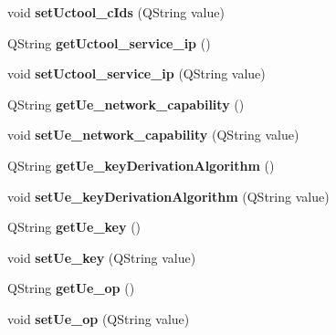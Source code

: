 \begin{DoxyCompactItemize}
\item 
void {\bfseries set\+Uctool\+\_\+c\+Ids} (Q\+String value)\hypertarget{class_ue_af285bcc0597ba10e0900b3abb677b772}{}\label{class_ue_af285bcc0597ba10e0900b3abb677b772}

\item 
Q\+String {\bfseries get\+Uctool\+\_\+service\+\_\+ip} ()\hypertarget{class_ue_a89424b4505fb125b0e30383eed88b0de}{}\label{class_ue_a89424b4505fb125b0e30383eed88b0de}

\item 
void {\bfseries set\+Uctool\+\_\+service\+\_\+ip} (Q\+String value)\hypertarget{class_ue_ac56432345c0765e5df0256e3419242c5}{}\label{class_ue_ac56432345c0765e5df0256e3419242c5}

\item 
Q\+String {\bfseries get\+Ue\+\_\+network\+\_\+capability} ()\hypertarget{class_ue_a8e3787efb14c2389f5bc174891e1dfde}{}\label{class_ue_a8e3787efb14c2389f5bc174891e1dfde}

\item 
void {\bfseries set\+Ue\+\_\+network\+\_\+capability} (Q\+String value)\hypertarget{class_ue_a93326268c1e8d4e31ab880e0545b69e4}{}\label{class_ue_a93326268c1e8d4e31ab880e0545b69e4}

\item 
Q\+String {\bfseries get\+Ue\+\_\+key\+Derivation\+Algorithm} ()\hypertarget{class_ue_ab24cb84e471460ad3e9341a6d2d28e65}{}\label{class_ue_ab24cb84e471460ad3e9341a6d2d28e65}

\item 
void {\bfseries set\+Ue\+\_\+key\+Derivation\+Algorithm} (Q\+String value)\hypertarget{class_ue_ab26b217b9be9825151c884c85daba3dd}{}\label{class_ue_ab26b217b9be9825151c884c85daba3dd}

\item 
Q\+String {\bfseries get\+Ue\+\_\+key} ()\hypertarget{class_ue_a5099b0f0987d8006bdfd2a9fe6ba4990}{}\label{class_ue_a5099b0f0987d8006bdfd2a9fe6ba4990}

\item 
void {\bfseries set\+Ue\+\_\+key} (Q\+String value)\hypertarget{class_ue_a88380930968f32dc900cdbd625fe9729}{}\label{class_ue_a88380930968f32dc900cdbd625fe9729}

\item 
Q\+String {\bfseries get\+Ue\+\_\+op} ()\hypertarget{class_ue_a595f96b5ca916c306147bb72e335277d}{}\label{class_ue_a595f96b5ca916c306147bb72e335277d}

\item 
void {\bfseries set\+Ue\+\_\+op} (Q\+String value)\hypertarget{class_ue_af595ec42490d9e6c03dc1fc2dd298bb6}{}\label{class_ue_af595ec42490d9e6c03dc1fc2dd298bb6}


\end{DoxyCompactItemize}
